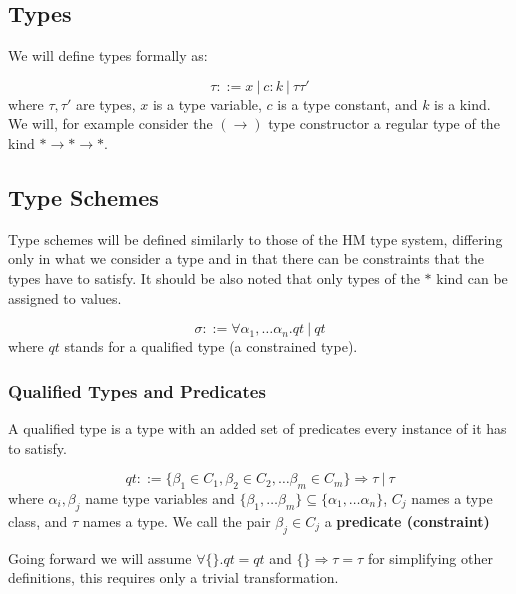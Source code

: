 \subsection{Types}

We will define types formally as:

\begin{defn}[types]
    $$\tau ::= x\ |\ c : k\ |\ \tau \tau'$$
    where $\tau, \tau'$ are types, $x$ is a type variable, $c$ is a type constant, and $k$ is a kind. We will, for example consider the $(\rightarrow)$ type constructor a regular type of the kind $* \rightarrow * \rightarrow *$.
\end{defn}

\subsection{Type Schemes}

Type schemes will be defined similarly to those of the HM type system, differing only in what we consider a type and in that there can be constraints that the types have to satisfy. It should be also noted that only types of the $*$ kind can be assigned to values.

\begin{defn}
    \label{defn:typeSchemes}
    $$\sigma ::= \forall \alpha_1, \dots \alpha_n . qt\ |\ qt$$
    where $qt$ stands for a qualified type (a constrained type).
\end{defn}

\subsubsection{Qualified Types and Predicates}

A qualified type is a type with an added set of predicates every instance of it has to satisfy.

\begin{defn}
    $$qt ::= \{\beta_1 \in C_1, \beta_2 \in C_2, \dots \beta_m \in C_m\} \Rightarrow \tau\ |\ \tau$$
    where $\alpha_i, \beta_j$ name type variables and $\{\beta_1, \dots \beta_m\} \subseteq \{\alpha_1, \dots \alpha_n\}$, $C_j$ names a type class, and $\tau$ names a type. We call the pair $\beta_j \in C_j$ a \textbf{predicate (constraint)} %
\end{defn}

Going forward we will assume $\forall \{\}. qt = qt$ and $\{\} \Rightarrow \tau = \tau$ for simplifying other definitions, this requires only a trivial transformation. %

